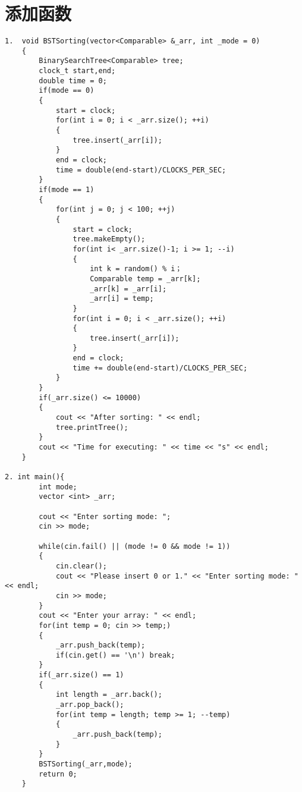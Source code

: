 \documentclass[a4paper]{article}
\begin{document}
\section{添加函数}
\begin{lstlisting}
1.  void BSTSorting(vector<Comparable> &_arr, int _mode = 0)
    {
        BinarySearchTree<Comparable> tree;
        clock_t start,end;
        double time = 0;
        if(mode == 0)
        {
            start = clock;
            for(int i = 0; i < _arr.size(); ++i)
            {
                tree.insert(_arr[i]);
            }
            end = clock;
            time = double(end-start)/CLOCKS_PER_SEC;
        }
        if(mode == 1)
        {
            for(int j = 0; j < 100; ++j)
            {
                start = clock;
                tree.makeEmpty();
                for(int i< _arr.size()-1; i >= 1; --i)
                {
                    int k = random() % i；
                    Comparable temp = _arr[k];
                    _arr[k] = _arr[i];
                    _arr[i] = temp;
                }
                for(int i = 0; i < _arr.size(); ++i)
                {
                    tree.insert(_arr[i]);
                }
                end = clock;
                time += double(end-start)/CLOCKS_PER_SEC;
            }
        }
        if(_arr.size() <= 10000)
        {
            cout << "After sorting: " << endl;
            tree.printTree();
        }
        cout << "Time for executing: " << time << "s" << endl;
    }

2. int main(){
        int mode;
        vector <int> _arr;
        
        cout << "Enter sorting mode: ";
        cin >> mode;
        
        while(cin.fail() || (mode != 0 && mode != 1))
        {
            cin.clear();
            cout << "Please insert 0 or 1." << "Enter sorting mode: " << endl;
            cin >> mode;
        }
        cout << "Enter your array: " << endl;
        for(int temp = 0; cin >> temp;)
        {
            _arr.push_back(temp);
            if(cin.get() == '\n') break;
        }
        if(_arr.size() == 1)
        {
            int length = _arr.back();
            _arr.pop_back();
            for(int temp = length; temp >= 1; --temp)
            {
                _arr.push_back(temp);
            }
        }
        BSTSorting(_arr,mode);
        return 0;
    }
\end{lstlisting}
\end{document}
